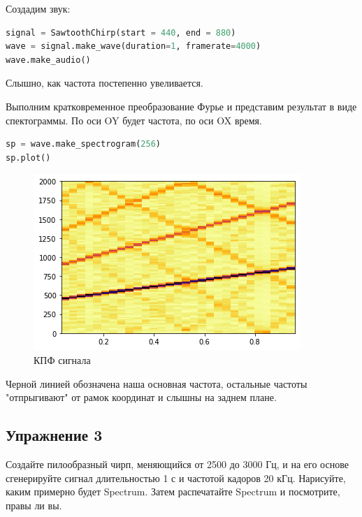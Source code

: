 Создадим звук:

\begin{lstlisting}[language=Python]
signal = SawtoothChirp(start = 440, end = 880)
wave = signal.make_wave(duration=1, framerate=4000)
wave.make_audio()
\end{lstlisting}

Слышно, как частота постепенно увеливается.

Выполним кратковременное преобразование Фурье и представим результат в виде спектограммы. По оси OY будет частота, по оси OX время.

\begin{lstlisting}[language=Python]
sp = wave.make_spectrogram(256)
sp.plot()
\end{lstlisting}
\begin{figure}[H]
	\begin{center}
		\includegraphics[scale=1]{fig/lab03/lab03_23_0.png}
		\caption{КПФ сигнала}
	\end{center}
\end{figure}

Черной линией обозначена наша основная частота, остальные частоты "отпрыгивают" от рамок координат и слышны на заднем плане.

\subsection{Упражнение 3}

Создайте пилообразный чирп, меняющийся от 2500 до 3000 Гц, и на его основе сгенерируйте сигнал длительностью 1 с и частотой кадоров 20 кГц. Нарисуйте, каким примерно будет Spectrum. Затем распечатайте Spectrum и посмотрите, правы ли вы.

